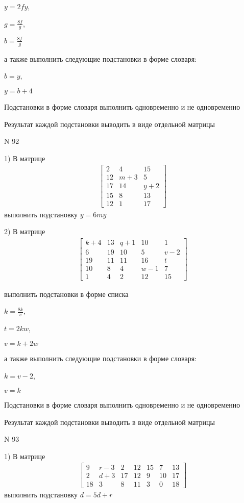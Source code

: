 \documentclass[11pt]{report}
\begin{document}
$y=2 f y$,

$g=\frac{8 f}{g}$,

$b=\frac{8 f}{g}$

а также выполнить следующие подстановки в форме словаря:

$b=y$,

$y=b + 4$


    Подстановки в форме словаря выполнить одновременно и не одновременно


    Результат каждой подстановки выводить в виде отдельной матрицы

\newpage
N 92


    1) В матрице
\begin{align*}
\left[\begin{matrix}2 & 4 & 15\\12 & m + 3 & 5\\17 & 14 & y + 2\\15 & 8 & 13\\12 & 1 & 17\end{matrix}\right]
\end{align*}
выполнить подстановку $y=6 m y$


    2) В матрице
\begin{align*}
\left[\begin{matrix}k + 4 & 13 & q + 1 & 10 & 1\\6 & 19 & 10 & 5 & v - 2\\19 & 11 & 11 & 16 & t\\10 & 8 & 4 & w - 1 & 7\\1 & 4 & 2 & 12 & 15\end{matrix}\right]
\end{align*}

выполнить подстановки в форме списка

$k=\frac{8 k}{v}$,

$t=2 k w$,

$v=k + 2 w$

а также выполнить следующие подстановки в форме словаря:

$k=v - 2$,

$v=k$


    Подстановки в форме словаря выполнить одновременно и не одновременно


    Результат каждой подстановки выводить в виде отдельной матрицы

\newpage
N 93


    1) В матрице
\begin{align*}
\left[\begin{matrix}9 & r - 3 & 2 & 12 & 15 & 7 & 13\\2 & d + 3 & 17 & 12 & 9 & 10 & 17\\18 & 3 & 8 & 11 & 3 & 0 & 18\end{matrix}\right]
\end{align*}
выполнить подстановку $d=5 d + r$
\end{document}
